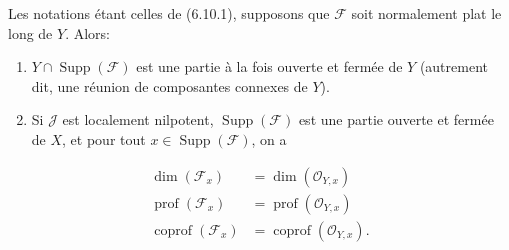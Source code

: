 \begin{proposition}[6.10.3]
\label{IV.2.s6.10.3-fr}
Les notations étant celles de \textup{(6.10.1)}, supposons que $\mathcal F$ soit
normalement plat le long de $Y$. Alors:
\begin{enumerate}
\item[\textup{(i)}] $Y\cap\operatorname{Supp}(\mathcal F)$ est une partie à la fois
ouverte et fermée de $Y$ \textup{(autrement dit, une} réunion de composantes connexes
de $Y$).
\item[\textup{(ii)}] Si $\mathcal J$ est localement nilpotent,
$\operatorname{Supp}(\mathcal F)$ est une partie ouverte et fermée de $X$, et
pour tout $x\in\operatorname{Supp}(\mathcal F)$, on a
\end{enumerate}
\begin{align}
\dim(\mathcal F_x)&=\dim(\mathcal O_{Y,x})
  \tag{6.10.3.1}\label{IV.2.s6.10.3.1-fr}\\
\operatorname{prof}(\mathcal F_x)&=\operatorname{prof}(\mathcal O_{Y,x})
  \tag{6.10.3.2}\label{IV.2.s6.10.3.2-fr}\\
\operatorname{coprof}(\mathcal F_x)&=\operatorname{coprof}(\mathcal O_{Y,x}).
  \tag{6.10.3.3}\label{IV.2.s6.10.3.3-fr}
\end{align}
\end{proposition}

